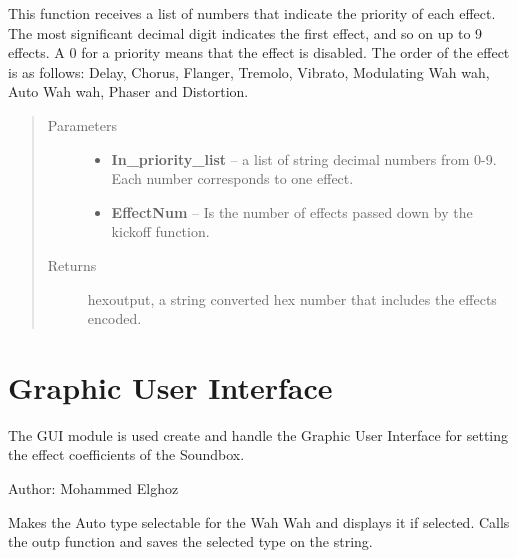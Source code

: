 \documentclass[letterpaper,10pt,english]{sphinxmanual}
\begin{document}

\begin{fulllineitems}
\label{Code:DataStrLeon.prioritizer}
This function receives a list of numbers that indicate the priority of each effect. The most significant decimal digit 
indicates the first effect, and so on up to 9 effects. A 0 for a priority means that the effect is disabled.
The order of the effect is as follows: 
Delay, Chorus, Flanger,  Tremolo, Vibrato, Modulating Wah wah, Auto Wah wah, Phaser and Distortion.
\begin{quote}\begin{description}
\item[{Parameters}] \leavevmode\begin{itemize}
\item {} 
\textbf{In\_priority\_list} -- a list of string decimal numbers from 0-9. Each number corresponds to one effect.

\item {} 
\textbf{EffectNum} -- Is the number of effects passed down by the kickoff function.

\end{itemize}

\item[{Returns}] \leavevmode
hexoutput, a string converted hex number that includes the effects encoded.

\end{description}\end{quote}

\end{fulllineitems}



\section{Graphic User Interface}
\label{Code:graphic-user-interface}\label{Code:module-GUI}
The GUI module is used create and handle the Graphic User Interface for setting the
effect coefficients of the Soundbox.

Author: Mohammed Elghoz

\begin{fulllineitems}
\label{Code:GUI.AUTO_val}
Makes the Auto type selectable for the Wah Wah and displays it if selected. Calls the outp function and saves the selected 
type on the string.

\end{fulllineitems}
\end{document}
